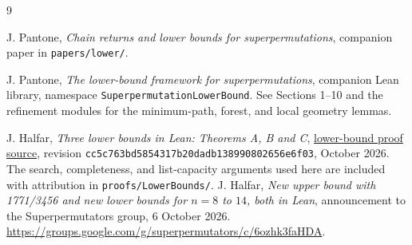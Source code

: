 \documentclass[11pt]{article}
\begin{document}
\begin{thebibliography}{9}
\small
\raggedright
{}
J. Pantone, \emph{Chain returns and lower bounds for superpermutations},
companion paper in \nolinkurl{papers/lower/}.

J. Pantone, \emph{The lower-bound framework for superpermutations},
companion Lean library, namespace \texttt{SuperpermutationLowerBound}.
See Sections 1--10 and the refinement modules for the minimum-path,
forest, and local geometry lemmas.

J. Halfar, \emph{Three lower bounds in Lean: Theorems A, B and C},
\href{https://github.com/jhalfar/superpermutations/tree/cc5c763bd5854317b20dadb138990802656e6f03/proofs/lean/lower}{lower-bound proof source},
revision \texttt{cc5c763bd5854317b20dadb138990802656e6f03}, October 2026.
The search, completeness, and list-capacity arguments used here are
included with attribution in \nolinkurl{proofs/LowerBounds/}.
J. Halfar, \emph{New upper bound with 1771/3456 and new lower bounds
for $n=8$ to $14$, both in Lean}, announcement to the Superpermutators
group, 6 October 2026.
\url{https://groups.google.com/g/superpermutators/c/6ozhk3faHDA}.
\end{thebibliography}
\end{document}
